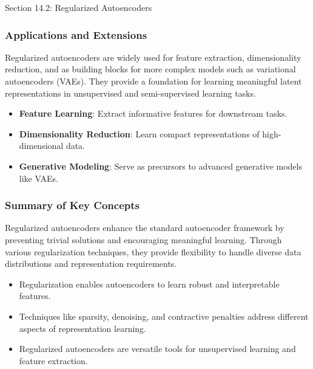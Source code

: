 \begin{notes}{Section 14.2: Regularized Autoencoders}
    \subsubsection*{Applications and Extensions}
    
    Regularized autoencoders are widely used for feature extraction, dimensionality reduction, and as building blocks for more complex models such as variational autoencoders (VAEs). They provide a 
    foundation for learning meaningful latent representations in unsupervised and semi-supervised learning tasks.
    
    \begin{highlight}
        \begin{itemize}
            \item \textbf{Feature Learning}: Extract informative features for downstream tasks.
            \item \textbf{Dimensionality Reduction}: Learn compact representations of high-dimensional data.
            \item \textbf{Generative Modeling}: Serve as precursors to advanced generative models like VAEs.
        \end{itemize}
    \end{highlight}
    
    \subsubsection*{Summary of Key Concepts}
    
    Regularized autoencoders enhance the standard autoencoder framework by preventing trivial solutions and encouraging meaningful learning. Through various regularization techniques, they provide 
    flexibility to handle diverse data distributions and representation requirements.
    
    \begin{highlight}
        \begin{itemize}
            \item Regularization enables autoencoders to learn robust and interpretable features.
            \item Techniques like sparsity, denoising, and contractive penalties address different aspects of representation learning.
            \item Regularized autoencoders are versatile tools for unsupervised learning and feature extraction.
        \end{itemize}
    \end{highlight}
\end{notes}

